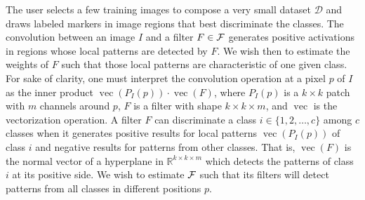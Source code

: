 \documentclass[a4paper,conference]{IEEEtran}
\DeclareMathOperator{\vect}{vec}
\newcommand{\R}{\mathbb{R}}
\newcommand{\D}{\mathcal{D}}
\begin{document}
The user selects a few training images to compose a very small dataset $\D$ and draws labeled markers in image regions that best discriminate the classes. The convolution between an image $I$ and a filter $F\in {\cal F}$ generates positive activations in regions whose local patterns are detected by $F$. We wish then to estimate the weights of $F$ such that those local patterns are characteristic of one given class. For sake of clarity, one must interpret the convolution operation at a pixel $p$ of $I$ as the inner product $\vect(P_I(p)) \cdot \vect(F)$, where $P_I(p)$ is a $k\times k$ patch with $m$ channels around $p$, $F$ is a filter with shape $k\times k \times m$, and $\vect$ is the vectorization operation. A filter $F$ can discriminate a class $i \in \{1,2,\ldots,c\}$ among $c$ classes when it generates positive results for local patterns $\vect(P_I(p))$ of class $i$ and negative results for patterns from other classes. That is, $\vect(F)$ is the normal vector of a hyperplane in $\R^{k\times k\times m}$ which detects the patterns of class $i$ at its positive side. We wish to estimate ${\cal F}$ such that its filters will detect patterns from all classes in different positions $p$. 
\end{document}
